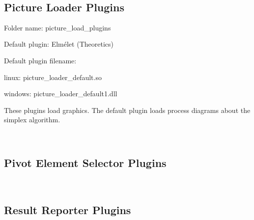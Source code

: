 ~\newline
 

\hypertarget{index_picture_loader_default}{}\subsection{Picture Loader Plugins}\label{index_picture_loader_default}

\begin{DoxyItemize}
\item Folder name\+: picture\+\_\+load\+\_\+plugins
\item Default plugin\+: Elmélet (Theoretics)
\item Default plugin filename\+:
\begin{DoxyItemize}
\item linux\+: picture\+\_\+loader\+\_\+default.\+so
\item windows\+: picture\+\_\+loader\+\_\+default1.\+dll
\end{DoxyItemize}
\end{DoxyItemize}

These plugins load graphics. The default plugin loads process diagrams about the simplex algorithm.

~\newline
 

\hypertarget{index_pivot_selector_plugins}{}\subsection{Pivot Element Selector Plugins}\label{index_pivot_selector_plugins}
~\newline




\hypertarget{index_result_reporter_plugins}{}\subsection{Result Reporter Plugins}\label{index_result_reporter_plugins}
~\newline




 